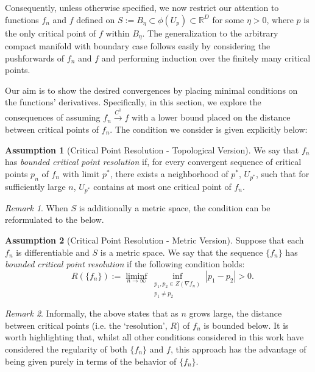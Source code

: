 \documentclass[11pt]{article}
\newcommand{\1}{\mathbf{1}}
\theoremstyle{definition}
\newtheorem{assumption}{Assumption}%
\theoremstyle{remark}
\newtheorem*{remark}{Remark}
\begin{document}
    Consequently, unless otherwise specified, we now restrict our attention to functions $f_n$ and $f$ defined on $S := B_\eta \subset \phi(U_p) \subset \mathbb{R}^D$ for some $\eta > 0$, where $p$ is the only critical point of $f$ within $B_\eta$.  The generalization to the arbitrary compact manifold with boundary case follows easily by considering the pushforwards of $f_n$ and $f$ and performing induction over the finitely many critical points.


Our aim is to show the desired convergences by placing minimal conditions on the functions' derivatives. Specifically, in this section, we explore the consequences of assuming $f_n\xrightarrow{C^1}f$ with a lower bound placed on the distance between critical points of $f_n$. The condition we consider is given explicitly below:
\begin{examplebox}
    \begin{assumption}[Critical Point Resolution - Topological Version]\label{assumption:crit_tplgcl} We say that $f_n$ has \textit{bounded critical point resolution} if, for every convergent sequence of critical points $p_n$ of $f_n$ with limit $p^*$, there exists a neighborhood of $p^*$, $U_{p^*}$, such that for sufficiently large $n$, $U_{p^*}$ contains at most one critical point of $f_n$.
    \end{assumption}
    \vspace{0.3cm}
\end{examplebox}
\begin{remark}
    When $S$ is additionally a metric space, the condition can be reformulated to the below.
\end{remark}

\begin{examplebox}
    \begin{assumption}[Critical Point Resolution - Metric Version]\label{assumption:crit} Suppose that each $f_n$ is differentiable and $S$ is a metric space. We say that the sequence $\{f_n\}$ has \textit{bounded critical point resolution} if the following condition holds:\\
    \begin{equation}\nonumber
    \quad R(\{ f_n\}):=\liminf_{n\rightarrow\infty}\inf_{\substack{p_1,p_2\in Z(\nabla f_n)\\ p_1\neq p_2}}|p_1-p_2|>0. 
    \end{equation}
    \end{assumption}
    \vspace{0.3cm}
\end{examplebox}
\begin{remark}
    Informally, the above states that as $n$ grows large, the distance between critical points (i.e. the `resolution', $R$) of $f_n$ is bounded below. It is worth highlighting that, whilst all other conditions considered in this work have considered the regularity of both $\{f_n\}$ and $f$, this approach has the advantage of being given purely in terms of the behavior of $\{f_n\}$.
\end{remark}
\end{document}
